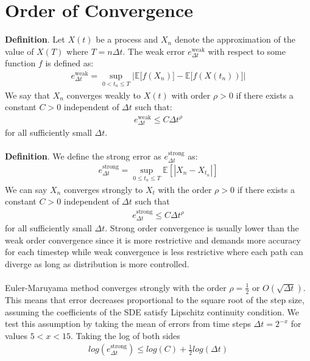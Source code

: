 \section*{Order of Convergence}
\textbf{Definition}. Let $X(t)$ be a process and $X_n$ denote the approximation of the value of $X(T)$ where $T = n\Delta t$. The weak error $e_{\Delta t}^{\text{weak}}$ with respect to some function $f$ is defined as:
\begin{align*}
e_{\Delta t}^{\text{weak}} = \sup_{0 \lt t_n \le T} \bigg|\mathbb{E}\big[f(X_n)\big] - \mathbb{E}\big[f(X(t_n))\big] \bigg|
\end{align*}
We say that $X_n$ converges weakly to $X(t)$ with order $\rho > 0$ if there exists a constant $C > 0$ independent of  $\Delta t$ such that:
\begin{align*}
e_{\Delta t}^{\text{weak}} \le C \Delta t^{\rho}
\end{align*}
for all sufficiently small $\Delta t$.
\\
\\
\textbf{Definition}. We define the strong error as $e_{\Delta t}^{\text{strong}}$ as:
\begin{align*}
e_{\Delta t}^{\text{strong}} = \sup_{0 \le t_n \le T} \mathbb{E}\left[\left|X_n - X_{t_n}\right|\right]
\end{align*}
We can say $X_n$ converges strongly to $X_t$ with the order $\rho > 0$ if there exists a constant $C > 0$ independent of $\Delta t$ such that
\begin{align*}
e_{\Delta t}^{\text{strong}} \le C \Delta t^{\rho}
\end{align*}
for all sufficiently small $\Delta t$.
Strong order convergence is usually lower than the weak order convergence since it is more restrictive and demands more accuracy for each timestep while weak convergence is less restrictive where each path can diverge as long as distribution is more controlled.
\\
\\
Euler-Maruyama method converges strongly with the order $\rho=\frac{1}{2}$ or $O(\sqrt{\Delta t})$. This means that error decreases proportional to the square root of the step size, assuming the coefficients of the SDE satisfy Lipschitz\cite{wiki:lipschitz_continuity} continuity condition.
We test this assumption by taking the mean of errors from time steps $\Delta t=2^{-x}$ for values $5 < x < 15$\cite{code}. Taking the log of both sides
\begin{align*}
log\left(e_{\Delta t}^{\text{strong}}\right) \le log(C) + \frac{1}{2} log(\Delta t)
\end{align*}
